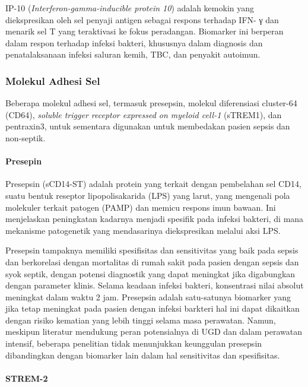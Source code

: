 \documentclass[
  10pt,
  letterpaper,
]{article}
\begin{document}
IP-10 (\emph{Interferon-gamma-inducible protein 10}) adalah kemokin yang
diekspresikan oleh sel penyaji antigen sebagai respons terhadap IFN- γ
dan menarik sel T yang teraktivasi ke fokus
peradangan.\citep{Ashkenazi-Hoffnung2021} Biomarker ini berperan dalam
respon terhadap infeksi bakteri, khususnya dalam diagnosis dan
penatalaksanaan infeksi saluran kemih, TBC, dan penyakit
autoimun.\citep{van2017}

\subsubsection{Molekul Adhesi Sel}\label{molekul-adhesi-sel}

Beberapa molekul adhesi sel, termasuk presepsin, molekul diferensiasi
cluster-64 (CD64), \emph{soluble trigger receptor expressed on myeloid
cell-1} (sTREM1), dan pentraxin3, untuk sementara digunakan untuk
membedakan pasien sepsis dan non-septik.

\paragraph{Presepin}\label{presepin}

Presepsin (sCD14-ST) adalah protein yang terkait dengan pembelahan sel
CD14, suatu bentuk reseptor lipopolisakarida (LPS) yang larut, yang
mengenali pola molekuler terkait patogen (PAMP) dan memicu respons imun
bawaan.\citep{Velissaris2021, Kyriazopoulou2023} Ini menjelaskan
peningkatan kadarnya menjadi spesifik pada infeksi bakteri, di mana
mekanisme patogenetik yang mendasarinya diekspresikan melalui aksi LPS.

Presepsin tampaknya memiliki spesifisitas dan sensitivitas yang baik
pada sepsis dan berkorelasi dengan mortalitas di rumah sakit pada pasien
dengan sepsis dan syok septik, dengan potensi diagnostik yang dapat
meningkat jika digabungkan dengan parameter klinis. Selama keadaan
infeksi bakteri, konsentrasi nilai absolut meningkat dalam waktu 2 jam.
Presepsin adalah satu-satunya biomarker yang jika tetap meningkat pada
pasien dengan infeksi barkteri hal ini dapat dikaitkan dengan risiko
kematian yang lebih tinggi selama masa perawatan.\citep{Wu2017} Namun,
meskipun literatur mendukung peran potensialnya di UGD dan dalam
perawatan intensif, beberapa penelitian tidak menunjukkan keunggulan
presepsin dibandingkan dengan biomarker lain dalam hal sensitivitas dan
spesifisitas.\citep{Romualdo2014}

\paragraph{STREM-2}\label{strem-2}
\end{document}

